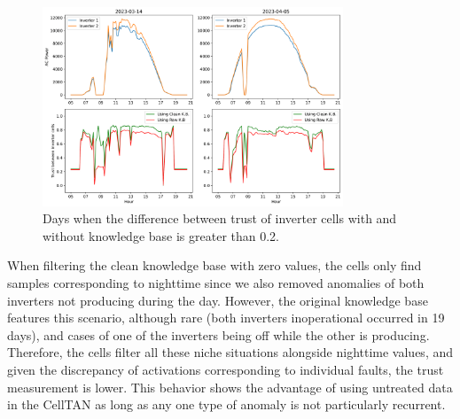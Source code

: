 \begin{figure}[h!]
    \centering
    \includegraphics[width=0.8\textwidth]{figures/chapter5/results/real/trust_dirty_interesting_days-1.png}
    \caption{Days when the difference between trust of inverter cells with and without knowledge base is greater than 0.2.}
    \label{fig:dirty_interesting}
\end{figure}

When filtering the clean knowledge base with zero values, the cells only find samples corresponding to nighttime since we also removed anomalies of both inverters not producing during the day. However, the original knowledge base features this scenario, although rare (both inverters inoperational occurred in 19 days), and cases of one of the inverters being off while the other is producing. Therefore, the cells filter all these niche situations alongside nighttime values, and given the discrepancy of activations corresponding to individual faults, the trust measurement is lower. This behavior shows the advantage of using untreated data in the CellTAN as long as any one type of anomaly is not particularly recurrent.





